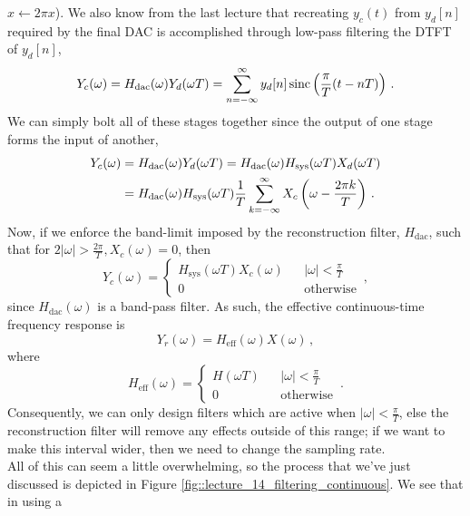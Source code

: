 $x\leftarrow 2\pi x$). We also know from the last lecture that recreating
$y_c(t)$ from $y_d[n]$ required by the final DAC is accomplished through
low-pass filtering the DTFT of $y_d[n]$,
%
\begin{displaymath}
  Y_c(\omega) = H_\mathrm{dac}(\omega)Y_d(\omega T)
  = \sum_{n=-\infty}^\infty y_d[n]\operatorname{sinc}\left(\frac{\pi}{T}(t - nT)\right) \,.
\end{displaymath}
%
We can simply bolt all of these stages together since the output of one
stage forms the input of another,
%
\begin{align*}
  Y_c(\omega) &= H_\mathrm{dac}(\omega)Y_d(\omega T)
  = H_\mathrm{dac}(\omega)H_\mathrm{sys}(\omega T)X_d(\omega T) \\
  &= H_\mathrm{dac}(\omega)H_\mathrm{sys}(\omega T)\frac{1}{T}\sum_{k=-\infty}^\infty X_c\left(\omega - \frac{2\pi k}{T}\right) \,.
\end{align*}
%
Now, if we enforce the band-limit imposed by the reconstruction filter,
$H_{\mathrm{dac}}$, such that for
$2|\omega| > \frac{2\pi}{T}, X_c(\omega) = 0$, then
%
\begin{displaymath}
  Y_c(\omega) = \left\{\begin{array}{ccl}
  H_\mathrm{sys}(\omega T)X_c(\omega) & & |\omega| < \frac{\pi}{T} \\
  0 & & \mathrm{otherwise}
  \end{array}\right. \,,
\end{displaymath}
%
since $H_\mathrm{dac}(\omega)$ is a band-pass filter. As such, the effective
continuous-time frequency response is
%
\begin{displaymath}
  Y_r(\omega) = H_{\mathrm{eff}}(\omega)X(\omega) \,,
\end{displaymath}
%
where
%
\begin{displaymath}
  H_{\mathrm{eff}}(\omega) = \left\{\begin{array}{ccl}
  H(\omega T) & & |\omega| < \frac{\pi}{T} \\
  0 & & \mathrm{otherwise}
  \end{array}\right. \,.
\end{displaymath}
%
Consequently, we can only design filters which are active when
$|\omega| < \frac{\pi}{T}$, else the reconstruction filter will remove
any effects outside of this range; if we want to make this interval wider,
then we need to change the sampling rate.\\
%
All of this can seem a little overwhelming, so the process that
we've just discussed is depicted in Figure
\ref{fig::lecture_14_filtering_continuous}. We see that in using a

